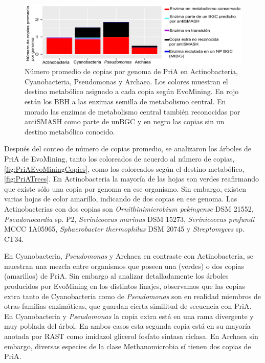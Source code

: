\documentclass[12pt,twoside]{reedthesis}
\begin{document}
  \begin{figure}[h!tbp]
  \centering
  \includegraphics[angle = 0,scale = 0.8]{chapter4/PriAExpansiones.png}
  \caption[Expansiones de PriA en Actinobacteria, Cyanobacteria, Pseudomonas y Archaea]{\footnotesize{Número promedio de copias por genoma de PriA en Actinobacteria, Cyanobacteria, Pseudomonas y Archaea. Los colores muestran el destino metabólico asignado a cada copia según EvoMining. En rojo están los BBH a las enzimas semilla de metabolismo central. En morado las enzimas de metabolismo central también reconocidas por antiSMASH como parte de unBGC y en negro las copias sin un destino metabólico conocido.}}
  \label{fig:PriA_Expansiones}
  \end{figure}
  
  Después del conteo de número de copias promedio, se analizaron los
  árboles de PriA de EvoMining, tanto los coloreados de acuerdo al número
  de copias, \autoref{fig:PriAEvoMiningCopies}, como los coloreados según
  el destino metabólico, \autoref{fig:PriATrees}. En Actinobacteria la
  mayoría de las hojas son verdes reafirmando que existe sólo una copia
  por genoma en ese organismo. Sin embargo, existen varias hojas de color
  amarillo, indicando de dos copias en ese genoma. Las Actinobacterias con
  dos copias son \emph{Ornithinimicrobium pekingense} DSM 21552,
  \emph{Pseudonocardia} sp. P2, \emph{Serinicoccus marinus} DSM 15273,
  \emph{Serinicoccus profundi} MCCC 1A05965, \emph{Sphaerobacter
  thermophilus} DSM 20745 y \emph{Streptomyces} sp. CT34.
  
  En Cyanobacteria, \emph{Pseudomonas} y Archaea en contraste con
  Actinobacteria, se muestran una mezcla entre organismos que poseen una
  (verdes) o dos copias (amarillos) de PriA. Sin embargo al analizar
  detalladamente los árboles producidos por EvoMining en los distintos
  linajes, observamos que las copias extra tanto de Cyanobacteria como de
  \emph{Pseudomonas} son en realidad miembros de otras familias
  enzimáticas, que guardan cierta similitud de secuencia con PriA. En
  Cyanobacteria y \emph{Pseudomonas} la copia extra está en una rama
  divergente y muy poblada del árbol. En ambos casos esta segunda copia
  está en su mayoría anotada por RAST como imidazol glicerol fosfato
  sintasa ciclasa. En Archaea sin embargo, diversas especies de la clase
  Methanomicrobia sí tienen dos copias de PriA.
  
\end{document}
